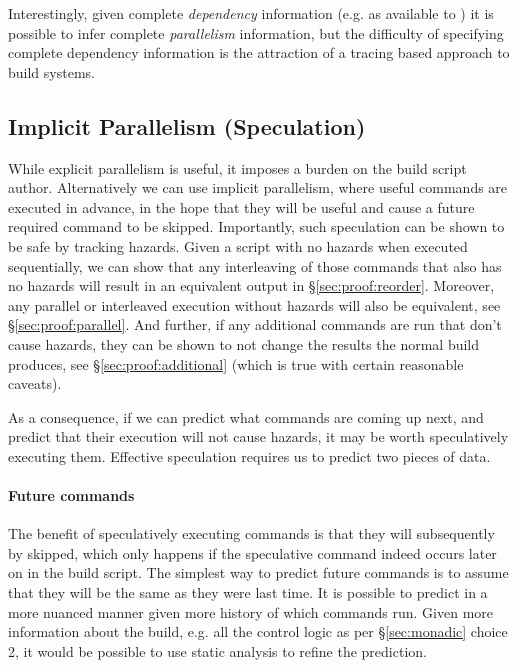 Interestingly, given complete \emph{dependency} information (e.g. as available to \Make) it is possible to infer complete \emph{parallelism} information, but the difficulty of specifying complete dependency information is the attraction of a tracing based approach to build systems.

\subsection{Implicit Parallelism (Speculation)}
\label{sec:speculation}

While explicit parallelism is useful, it imposes a burden on the build script author. Alternatively we can use implicit parallelism, where useful commands are executed in advance, in the hope that they will be useful and cause a future required command to be skipped. Importantly, such speculation can be shown to be safe by tracking hazards. Given a script with no hazards when executed sequentially, we can show that any interleaving of those commands that also has no hazards will result in an equivalent output in \S\ref{sec:proof:reorder}. Moreover, any parallel or interleaved execution without hazards will also be equivalent, see \S\ref{sec:proof:parallel}. And further, if any additional commands are run that don't cause hazards, they can be shown to not change the results the normal build produces, see \S\ref{sec:proof:additional} (which is true with certain reasonable caveats).

As a consequence, if we can predict what commands are coming up next, and predict that their execution will not cause hazards, it may be worth speculatively executing them. Effective speculation requires us to predict two pieces of data.

\paragraph{Future commands} The benefit of speculatively executing commands is that they will subsequently by skipped, which only happens if the speculative command indeed occurs later on in the build script. The simplest way to predict future commands is to assume that they will be the same as they were last time. It is possible to predict in a more nuanced manner given more history of which commands run. Given more information about the build, e.g. all the control logic as per \S\ref{sec:monadic} choice 2, it would be possible to use static analysis to refine the prediction.

